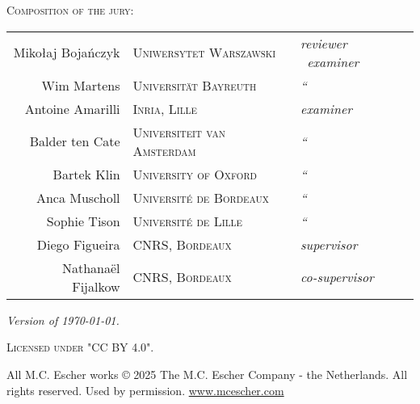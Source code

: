 \newpage
\thispagestyle{empty}
~
\newpage
\thispagestyle{empty}
\begin{fullwidth}
	\setlength{\parindent}{0pt}
	~\vfill
	\begin{center}
		\normalfont\Large\scshape Composition of the jury:\\[1.5em]
		\normalfont
		\begin{tabular}{r@{\hskip 1em}l@{\hskip 1em}l}
		  Mikołaj Bojańczyk & \textsc{\small Uniwersytet Warszawski} & \emph{reviewer \fancyand\ examiner}\\
		  Wim Martens & \textsc{\small Universität Bayreuth} & \emph{\hphantom{revi}``} \\[.5em]
		  Antoine Amarilli & \textsc{\small Inria, Lille} & \emph{examiner}\\
		  Balder ten Cate & \textsc{\small Universiteit van Amsterdam} & \emph{\hphantom{revi}``}\\
		  Bartek Klin & \textsc{\small University of Oxford} & \emph{\hphantom{revi}``}\\
		  Anca Muscholl & \textsc{\small Université de Bordeaux} & \emph{\hphantom{revi}``}\\
		  Sophie Tison & \textsc{\small Université de Lille} & \emph{\hphantom{revi}``}\\[.5em]
		  Diego Figueira & \textsc{\small CNRS, Bordeaux} & \emph{supervisor}\\
		  Nathanaël Fijalkow & \textsc{\small CNRS, Bordeaux} & \emph{co-supervisor}
		\end{tabular}
	\end{center}

	\vfill

	\par\textit{Version of \today.}
	\par\textsc{Licensed under "CC BY 4.0".}\newline

	\par{\footnotesize All M.C. Escher works © 2025 The M.C. Escher Company - the Netherlands. All rights reserved. Used by permission. \url{www.mcescher.com}}
\end{fullwidth}
